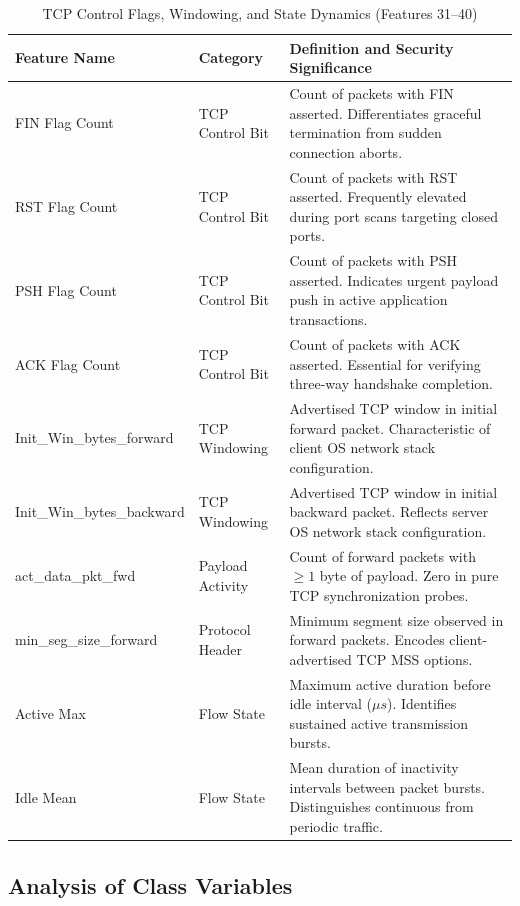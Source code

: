 \documentclass[12pt,a4paper]{report}
\begin{document}
\begin{table}[H]
\centering
\small
\renewcommand{\arraystretch}{1.15}
\begin{tabularx}{\textwidth}{|p{4.3cm}|p{2.8cm}|X|}
\hline
\textbf{Feature Name} & \textbf{Category} & \textbf{Definition and Security Significance} \\
\hline
FIN Flag Count & TCP Control Bit & Count of packets with FIN asserted. Differentiates graceful termination from sudden connection aborts. \\
\hline
RST Flag Count & TCP Control Bit & Count of packets with RST asserted. Frequently elevated during port scans targeting closed ports. \\
\hline
PSH Flag Count & TCP Control Bit & Count of packets with PSH asserted. Indicates urgent payload push in active application transactions. \\
\hline
ACK Flag Count & TCP Control Bit & Count of packets with ACK asserted. Essential for verifying three-way handshake completion. \\
\hline
Init\_Win\_bytes\_forward & TCP Windowing & Advertised TCP window in initial forward packet. Characteristic of client OS network stack configuration. \\
\hline
Init\_Win\_bytes\_backward & TCP Windowing & Advertised TCP window in initial backward packet. Reflects server OS network stack configuration. \\
\hline
act\_data\_pkt\_fwd & Payload Activity & Count of forward packets with $\ge 1$ byte of payload. Zero in pure TCP synchronization probes. \\
\hline
min\_seg\_size\_forward & Protocol Header & Minimum segment size observed in forward packets. Encodes client-advertised TCP MSS options. \\
\hline
Active Max & Flow State & Maximum active duration before idle interval ($\mu s$). Identifies sustained active transmission bursts. \\
\hline
Idle Mean & Flow State & Mean duration of inactivity intervals between packet bursts. Distinguishes continuous from periodic traffic. \\
\hline
\end{tabularx}
\caption{TCP Control Flags, Windowing, and State Dynamics (Features 31--40)}
\label{tab:feature_dictionary_part4}
\end{table}

\subsection{Analysis of Class Variables}
\end{document}
